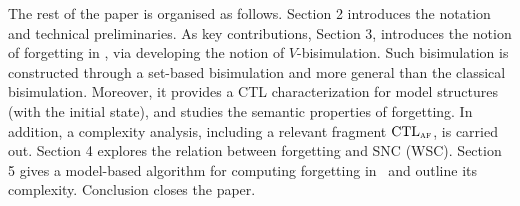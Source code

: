 \documentclass{article}
\begin{document}

The rest of the paper is organised as follows. Section 2 introduces the notation and technical preliminaries. As key contributions, Section 3, introduces the notion of forgetting in \CTL, via developing the notion of $V$-bisimulation. Such bisimulation is constructed through a set-based bisimulation and more general than the classical bisimulation. Moreover,  it provides a CTL characterization for model structures (with the initial state), and studies the semantic properties of forgetting. In addition, a complexity analysis, including a relevant fragment  $\textrm{CTL}_{\textsc{a}\textsc{f}}$, is carried out. 
Section 4 explores the relation between forgetting and SNC (WSC). Section 5 gives a model-based algorithm for computing forgetting in \CTL\ and outline its complexity. Conclusion closes the paper.
\end{document}

